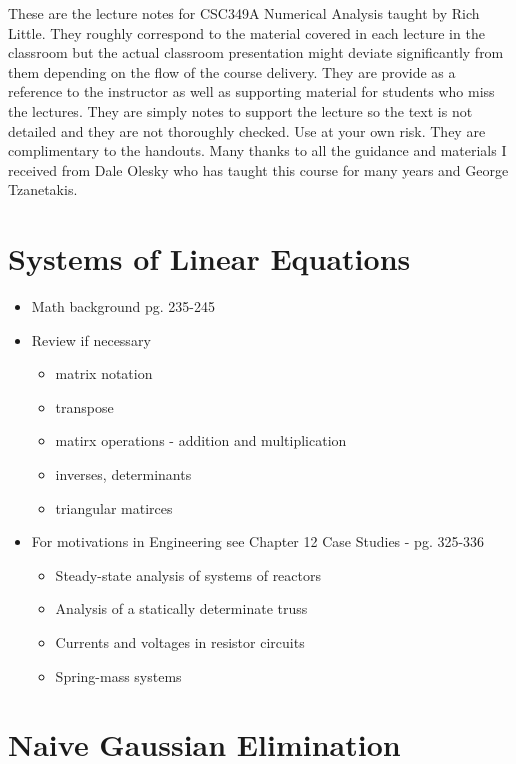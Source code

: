 \documentclass [titlepage,12pt,letter] {article}
\begin{document}
 


These are the lecture notes for CSC349A Numerical Analysis taught by
Rich Little. They roughly correspond to
the material covered in each lecture in the classroom but the actual
classroom presentation might deviate significantly from them depending
on the flow of the course delivery. They are provide as a reference to
the instructor as well as supporting material for students who miss
the lectures. They are simply notes to support the lecture so the text
is not detailed and they are not thoroughly checked. Use at your own
risk. They are complimentary to the handouts. Many thanks to all the
guidance and materials I received from Dale Olesky who has taught this
course for many years and George Tzanetakis. 


\section{Systems of Linear Equations}


\begin{itemize}
\item{Math background pg. 235-245}
\item{Review if necessary}
\begin{itemize}
\item{matrix notation}
\item{transpose}
\item{matirx operations - addition and multiplication}
\item{inverses, determinants}
\item{triangular matirces}
\end{itemize}
\item{For motivations in Engineering see Chapter 12 Case Studies - pg. 325-336}
\begin{itemize}
\item{Steady-state analysis of systems of reactors}
\item{Analysis of a statically determinate truss}
\item{Currents and voltages in resistor circuits}
\item{Spring-mass systems}
\end{itemize}
\end{itemize}


\section{Naive Gaussian Elimination}
\end{document}
